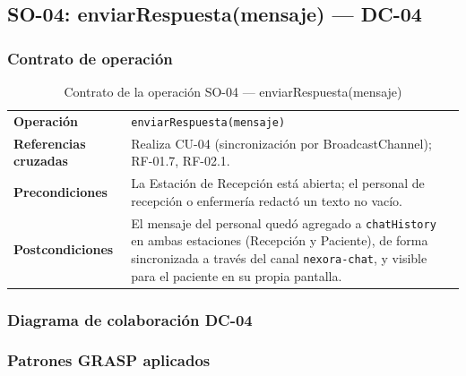 \subsection{SO-04: enviarRespuesta(mensaje) --- DC-04}

\subsubsection{Contrato de operación}

\begin{table}[H]
\centering
\begin{tabularx}{\textwidth}{@{}p{4.4cm} X@{}}
\toprule
\textbf{Operación} & \texttt{enviarRespuesta(mensaje)} \\
\textbf{Referencias cruzadas} & Realiza CU-04 (sincronización por
BroadcastChannel); RF-01.7, RF-02.1. \\
\textbf{Precondiciones} & La Estación de Recepción está abierta; el
personal de recepción o enfermería redactó un texto no vacío. \\
\textbf{Postcondiciones} & El mensaje del personal quedó agregado a
\texttt{chatHistory} en ambas estaciones (Recepción y Paciente), de forma
sincronizada a través del canal \texttt{nexora-chat}, y visible para el
paciente en su propia pantalla. \\
\bottomrule
\end{tabularx}
\caption{Contrato de la operación SO-04 --- enviarRespuesta(mensaje)}
\label{tab:col-contrato-so04}
\end{table}

\subsubsection{Diagrama de colaboración DC-04}


\subsubsection{Patrones GRASP aplicados}

